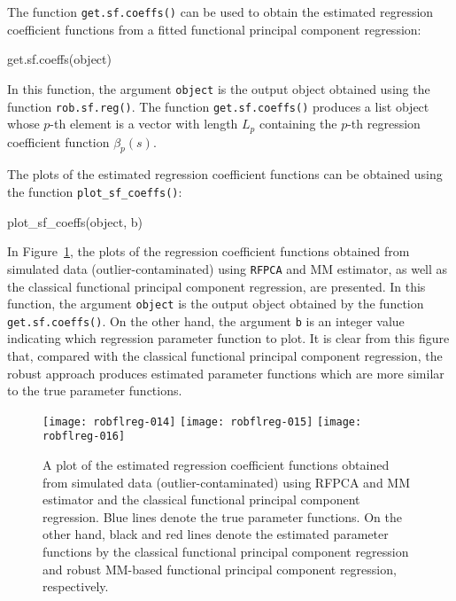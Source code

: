 The function \texttt{get.sf.coeffs()} can be used to obtain the estimated regression coefficient functions from a fitted functional principal component regression:
\begin{smallexample}
\begin{smallverbatim}
get.sf.coeffs(object)
\end{smallverbatim}
\end{smallexample}
In this function, the argument \texttt{object} is the output object obtained using the function \texttt{rob.sf.reg()}. The function \texttt{get.sf.coeffs()} produces a list object whose $p$-th element is a vector with length $L_p$ containing the $p$-th regression coefficient function $\beta_p(s)$.

The plots of the estimated regression coefficient functions can be obtained using the function \texttt{plot\_sf\_coeffs()}:
\begin{smallexample}
\begin{smallverbatim}
plot_sf_coeffs(object, b)
\end{smallverbatim}
\end{smallexample}
In Figure~\ref{fig:4}, the plots of the regression coefficient functions obtained from simulated data (outlier-contaminated) using \texttt{RFPCA} and MM estimator, as well as the classical functional principal component regression, are presented. In this function, the argument \texttt{object} is the output object obtained by the function \texttt{get.sf.coeffs()}. On the other hand, the argument \texttt{b} is an integer value indicating which regression parameter function to plot. It is clear from this figure that, compared with the classical functional principal component regression, the robust approach produces estimated parameter functions which are more similar to the true  parameter functions.
\begin{figure}[!htb]
  \begin{center}
\texttt{[image: robflreg-014]}
\texttt{[image: robflreg-015]}
\texttt{[image: robflreg-016]}
\end{center}
\caption{A plot of the estimated regression coefficient functions obtained from simulated data (outlier-contaminated) using RFPCA and MM estimator and the classical functional principal component regression. Blue lines denote the true parameter functions. On the other hand, black and red lines denote the estimated parameter functions by the classical functional principal component regression and robust MM-based functional principal component regression, respectively.}\label{fig:4}
\end{figure}

